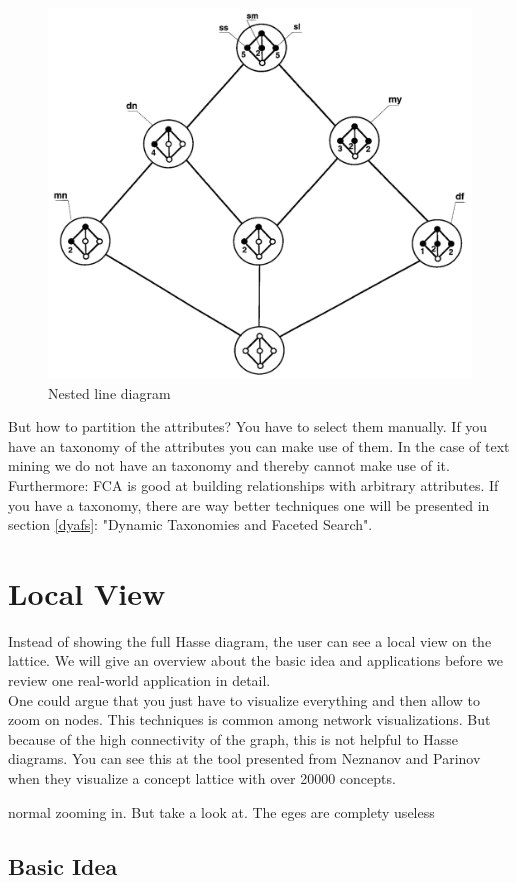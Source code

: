 \documentclass[11pt]{report}
\begin{document}
\begin{figure}[h]
	\centering
	\includegraphics[width=0.5\linewidth]{./images/nested}
\caption{Nested line diagram}
\label{figure:nested}
\end{figure}
	
But how to partition the attributes? You have to select them manually. If you have an taxonomy of the attributes you can make use of them. In the case of text mining we do not have an taxonomy and thereby cannot make use of it. Furthermore: FCA is good at building relationships with arbitrary attributes. If you have a taxonomy, there are way better techniques one will be presented in section \ref{dyafs}: "Dynamic Taxonomies and Faceted Search". \\

\section{Local View}
\label{Local View}

Instead of showing the full Hasse diagram, the user can see a local view on the lattice. We will give an overview about the basic idea and applications before we review one real-world application in detail. \\

One could argue that you just have to visualize everything and then allow to zoom on nodes. This techniques is common among network visualizations. But because of the high connectivity of the graph, this is not helpful to Hasse diagrams. You can see this at the tool presented from Neznanov and Parinov \cite{Neznanov2014} when they visualize a concept lattice with over 20000 concepts.

 normal zooming in. But take a look at. The eges are complety useless \\

\subsection{Basic Idea}
\end{document}
